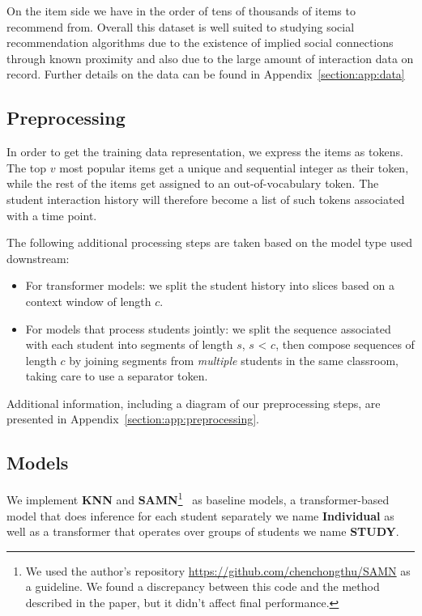 \documentclass{article}
\begin{document}
On the item side we have in the order of tens of thousands of items to recommend from.
Overall this dataset is well suited to studying social recommendation algorithms due to the existence of implied social connections through known proximity and also due to the large amount of interaction data on record. Further details on the data can be found in Appendix~\ref{section:app:data}




\subsection{Preprocessing}
\label{section:preprocessing}

In order to get the training data representation, we express the items as tokens. The top $v$ most popular items get a unique and sequential integer as their token, while the rest of the items get assigned to an out-of-vocabulary token. The student interaction history will therefore become a list of such tokens associated with a time point.

The following additional processing steps are taken based on the model type used downstream:
\begin{itemize}
    \item For transformer models: we split the student history into slices based on a context window of length $c$.
    \item For models that process students jointly: we split the sequence associated with each student into segments of length $s$, $s$ < $c$, then compose sequences of length $c$ by joining segments from \textit{multiple} students in the same classroom, taking care to use a separator token.
\end{itemize}

Additional information, including a diagram of our preprocessing steps, are presented in Appendix~\ref{section:app:preprocessing}.

\subsection{Models}
We implement \textbf{KNN} and \textbf{SAMN}\footnote{We used the author's repository \url{https://github.com/chenchongthu/SAMN} as a guideline. We found a discrepancy between this code and the method described in the paper, but it didn't affect final performance.}~\cite{chen2019behavior} as baseline models, a transformer-based model that does inference for each student separately we name \textbf{Individual} as well as a transformer that operates over groups of students we name \textbf{STUDY}. 
\end{document}
